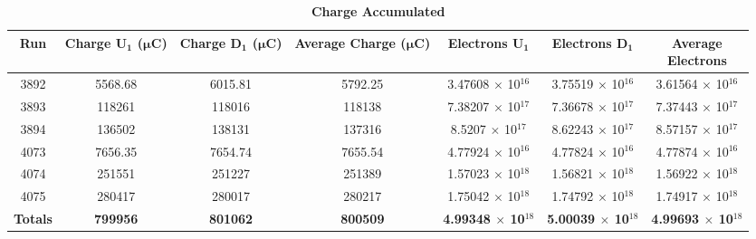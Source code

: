\begin{table}[!h]
\centering
\begin{tabular}{|c c c c c c c|}
\hline
\textbf{Run} & \makecell{\textbf{Charge}\\ $\boldsymbol{U_1}$ \\ ($\boldsymbol{\mu C}$)} & \makecell{\textbf{Charge}\\ $\boldsymbol{D_1}$ \\ ($\boldsymbol{\mu C}$)} & \makecell{\textbf{Average}\\ \textbf{Charge}\\ ($\boldsymbol{\mu C}$)} & \makecell{\textbf{Electrons} \\ $\boldsymbol{U_1}$} & \makecell{\textbf{Electrons} \\ $\boldsymbol{D_1}$} & \makecell{\textbf{Average} \\ \textbf{Electrons}}\\
\hline
3892 & 5568.68 & 6015.81 & 5792.25 & 3.47608 $\times$ 10$^{16}$ & 3.75519 $\times$ 10$^{16}$ & 3.61564 $\times$ 10$^{16}$ \\
3893 & 118261 & 118016 & 118138 & 7.38207 $\times$ 10$^{17}$ & 7.36678 $\times$ 10$^{17}$ & 7.37443 $\times$ 10$^{17}$ \\
3894 & 136502 & 138131 & 137316 & 8.5207 $\times$ 10$^{17}$ & 8.62243 $\times$ 10$^{17}$ & 8.57157 $\times$ 10$^{17}$ \\
4073 & 7656.35 & 7654.74 & 7655.54 & 4.77924 $\times$ 10$^{16}$ & 4.77824 $\times$ 10$^{16}$ & 4.77874 $\times$ 10$^{16}$ \\
4074 & 251551 & 251227 & 251389 & 1.57023 $\times$ 10$^{18}$ & 1.56821 $\times$ 10$^{18}$ & 1.56922 $\times$ 10$^{18}$ \\
4075 & 280417 & 280017 & 280217 & 1.75042 $\times$ 10$^{18}$ & 1.74792 $\times$ 10$^{18}$ & 1.74917 $\times$ 10$^{18}$ \\
\hline
\textbf{Totals} & \textbf{799956} & \textbf{801062} & \textbf{800509} & \textbf{4.99348 $\times$ 10$^{18}$} & \textbf{5.00039 $\times$ 10$^{18}$} & \textbf{4.99693 $\times$ 10$^{18}$} \\
\hline
\end{tabular}
\caption[Charge Accumulated]{\bf{Charge Accumulated}}
\label{tab:charges}
\end{table}

